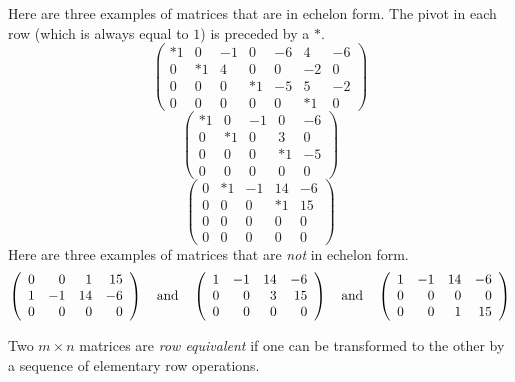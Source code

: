 \documentclass{ximera}
\begin{document}
Here are three examples of matrices that are in echelon form.
The pivot in each row (which is always equal to $1$) is preceded
by a $*$.
\[
\left(\begin{array}{rrrrrrr}
    *1   &  0   &  -1  &  0  &  -6  &   4  &  -6\\
     0   & *1   &  4   &  0  &   0  &  -2  &   0\\
     0   &  0   &  0   & *1  &  -5  &   5  &  -2\\
     0   &  0   &  0   &  0  &   0  &  *1  &   0
\end{array} \right)
\]
\[
\left(\begin{array}{rrrrr}
    *1 &   0  &  -1  &   0  &  -6 \\
     0 &  *1  &   0  &   3  &   0  \\
     0 &   0  &   0  &  *1  &  -5   \\
     0 &   0  &   0  &   0  &   0
\end{array} \right)
\]
\[
\left(\begin{array}{rrrrr}
     0  &  *1  &  -1  &  14  &  -6 \\
     0  &   0  &   0  &  *1  &  15  \\
     0  &   0  &   0  &   0  &   0   \\
     0  &   0  &   0  &   0  &   0
\end{array} \right)
\]
Here are three examples of matrices that are {\em not\/} in echelon form.
\[
\left(\begin{array}{rrrr}
     0  &   0  &   1  &  15  \\
     1  &  -1  &  14  &  -6 \\
     0  &   0  &   0  &   0   \\
\end{array} \right)
\quad\mbox{and}\quad
\left(\begin{array}{rrrr}
     1  &  -1  &  14  &  -6 \\
     0  &   0  &   3  &  15  \\
     0  &   0  &   0  &   0   \\
\end{array} \right)
\quad\mbox{and}\quad
\left(\begin{array}{rrrr}
     1  &  -1  &  14  &  -6 \\
     0  &   0  &   0  &   0   \\
     0  &   0  &   1  &  15  \\
\end{array} \right)
\]


\begin{Def} \label{D:roweq}
Two $m\times n$ matrices are {\em row equivalent\/} if one can be
transformed to the other by a sequence of elementary row
operations.
\end{Def}
\end{document}
